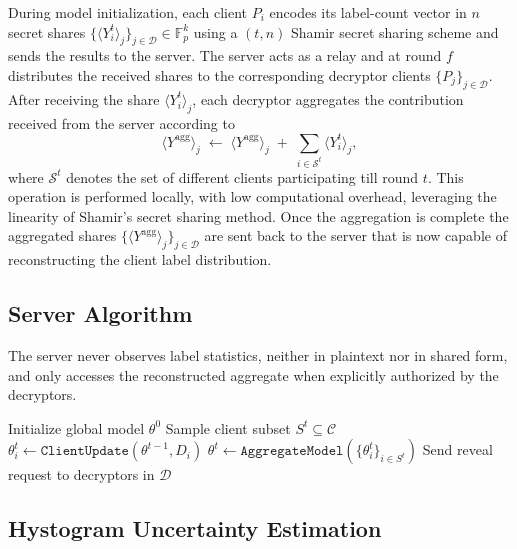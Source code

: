 \documentclass[runningheads]{llncs}
\begin{document}
During model initialization, each client $P_i$ encodes its label-count vector in $n$ secret shares
$\{\langle Y_i^t \rangle_j\}_{j \in \mathcal{D}} \in \mathbb{F}_p^{k}$ using a $(t,n)$ Shamir secret sharing scheme and sends the results to the server.
The server acts as a relay and at round $f$ distributes the received shares to the corresponding
decryptor clients $\{ P_j \}_{j \in \mathcal{D}}$. After receiving the share $\langle Y_i^t \rangle_j$, each decryptor aggregates the contribution received from the server according to
\[
\langle Y^{\mathrm{agg}} \rangle_j
\;\leftarrow\;
\langle Y^{\mathrm{agg}} \rangle_j
\;+\;
\sum_{i \in \mathcal{S}^t} \langle Y_i^t \rangle_j,
\]
where $\mathcal{S}^t$ denotes the set of different clients participating till round $t$.
This operation is performed locally, with low computational overhead, leveraging the linearity of Shamir's secret sharing method.
Once the aggregation is complete the aggregated shares $\{\langle Y^{\mathrm{agg}} \rangle_j\}_{j \in \mathcal{D}}$ are sent back to the server that is now capable of reconstructing the client label distribution.

\subsection{Server Algorithm}

The server never observes label statistics, neither in plaintext nor in shared form, and
only accesses the reconstructed aggregate when explicitly authorized by the decryptors.

\begin{algorithm}[h]
\caption{Federated Learning with Decryptor-Based Label Revelation}
\begin{algorithmic}[1]
\STATE Initialize global model $\theta^0$
    \STATE Sample client subset $S^t \subseteq \mathcal{C}$
        \STATE $\theta_i^t \leftarrow \texttt{ClientUpdate}(\theta^{t-1}, D_i)$
    \ENDFOR
    \STATE $\theta^t \leftarrow \texttt{AggregateModel}(\{\theta_i^t\}_{i \in S^t})$
        \STATE Send reveal request to decryptors in $\mathcal{D}$
    \ENDIF
\ENDFOR
\end{algorithmic}
\end{algorithm}

\subsection{Hystogram Uncertainty Estimation}
\end{document}
